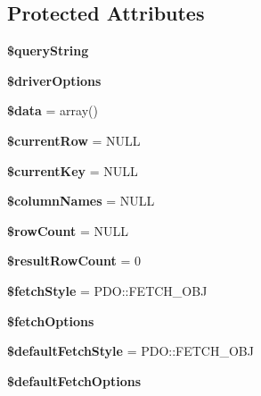 \subsection*{Protected Attributes}
\begin{DoxyCompactItemize}
\item 
\hypertarget{classDatabaseStatementPrefetch_a5cb3c11d2c50f6275c67336f09ad8466}{
{\bfseries \$queryString}}
\label{classDatabaseStatementPrefetch_a5cb3c11d2c50f6275c67336f09ad8466}

\item 
\hypertarget{classDatabaseStatementPrefetch_a9352fb8e26dd746b3ae32ed21ac6418c}{
{\bfseries \$driverOptions}}
\label{classDatabaseStatementPrefetch_a9352fb8e26dd746b3ae32ed21ac6418c}

\item 
\hypertarget{classDatabaseStatementPrefetch_a3f68fa8b6cf05e01129ee7f5667324ec}{
{\bfseries \$data} = array()}
\label{classDatabaseStatementPrefetch_a3f68fa8b6cf05e01129ee7f5667324ec}

\item 
\hypertarget{classDatabaseStatementPrefetch_aeec22ad3d579c4c0a407561ff6d593af}{
{\bfseries \$currentRow} = NULL}
\label{classDatabaseStatementPrefetch_aeec22ad3d579c4c0a407561ff6d593af}

\item 
\hypertarget{classDatabaseStatementPrefetch_af68167049f844d6b9b14a2e2aba9abe0}{
{\bfseries \$currentKey} = NULL}
\label{classDatabaseStatementPrefetch_af68167049f844d6b9b14a2e2aba9abe0}

\item 
\hypertarget{classDatabaseStatementPrefetch_acb31ad40c4d5ead7df6ea43df8c9db56}{
{\bfseries \$columnNames} = NULL}
\label{classDatabaseStatementPrefetch_acb31ad40c4d5ead7df6ea43df8c9db56}

\item 
\hypertarget{classDatabaseStatementPrefetch_afc4c942df62618b30b4fb063b99d4b04}{
{\bfseries \$rowCount} = NULL}
\label{classDatabaseStatementPrefetch_afc4c942df62618b30b4fb063b99d4b04}

\item 
\hypertarget{classDatabaseStatementPrefetch_a62a0a2203de2a01671e54d815b4c0968}{
{\bfseries \$resultRowCount} = 0}
\label{classDatabaseStatementPrefetch_a62a0a2203de2a01671e54d815b4c0968}

\item 
\hypertarget{classDatabaseStatementPrefetch_a5a6370426878ae5905c0953f959727d6}{
{\bfseries \$fetchStyle} = PDO::FETCH\_\-OBJ}
\label{classDatabaseStatementPrefetch_a5a6370426878ae5905c0953f959727d6}

\item 
{\bfseries \$fetchOptions}
\item 
\hypertarget{classDatabaseStatementPrefetch_ae6aee42c96fc7d934581533d31297c4d}{
{\bfseries \$defaultFetchStyle} = PDO::FETCH\_\-OBJ}
\label{classDatabaseStatementPrefetch_ae6aee42c96fc7d934581533d31297c4d}

\item 
{\bfseries \$defaultFetchOptions}
\end{DoxyCompactItemize}


